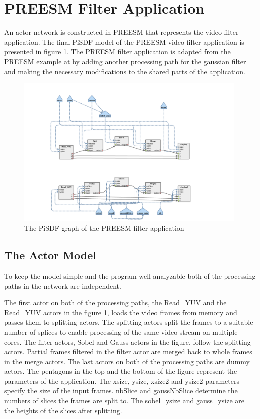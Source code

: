 \section{PREESM Filter Application}
\label{sec:preesmapp}
An actor network is constructed in PREESM that represents the video filter
application. The final PiSDF model of the PREESM video filter application is
presented in figure \ref{fig:preesm_actors}. The PREESM filter application is
adapted from the PREESM example at \cite{preesmtut} by adding another
processing path for the gaussian filter and making the necessary modifications
to the shared parts of the application.

\begin{figure}[h!]
    \begin{center}
        \includegraphics[width=0.99\textwidth]{images/preesm_diagram.png}
        \caption{The PiSDF graph of the PREESM filter application}
        \label{fig:preesm_actors}
    \end{center}
\end{figure}

\subsection{The Actor Model}
\label{subsec:actors}
To keep the model simple and the program well analyzable both of the processing
paths in the network are independent.

The first actor on both of the processing paths, the Read\_YUV and the
Read\_YUV actors in the figure \ref{fig:preesm_actors}, loads the video frames
from memory and passes them to splitting actors. The splitting actors split the
frames to a suitable number of splices to enable processing of the same video
stream on multiple cores. The filter actors, Sobel and Gauss actors in the
figure, follow the splitting actors. Partial frames filtered in the filter
actor are merged back to whole frames in the merge actors. The last actors on
both of the processing paths are dummy actors. The pentagons in the top and the
bottom of the figure represent the parameters of the application. The xsize,
ysize, xsize2 and ysize2 parameters specify the size of the input frames.
nbSlice and gaussNbSlice determine the numbers of slices the frames are split
to. The sobel\_ysize and gauss\_ysize are the heights of the slices after
splitting.

